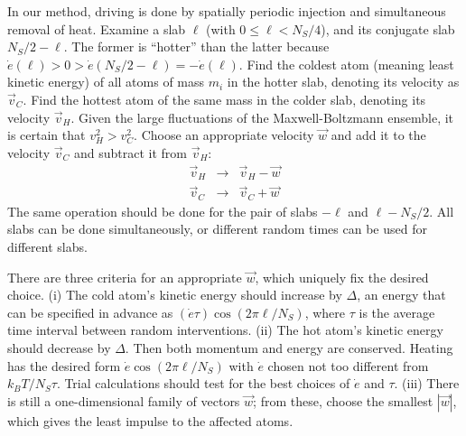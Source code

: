 \documentclass[aps,prb,twocolumn,showpacs,superscriptaddress]{revtex4-1}\begin{tiny}\end{tiny}
\begin{document}
In our method, driving is  done by spatially periodic injection and simultaneous removal of heat.  Examine a 
slab $\ell$ (with $0 \le \ell < N_S/4$), and its conjugate slab $N_S/2-\ell$.  The former
is ``hotter'' than the latter because ${\dot e}(\ell)>0>{\dot e}(N_S/2-\ell)=-{\dot e}(\ell)$.  Find the 
coldest atom (meaning least kinetic energy) of all atoms of mass $m_i$ 
in the hotter slab, denoting its velocity as $\vec{v}_C$.  Find the hottest atom
of the same mass in the colder slab, denoting its velocity $\vec{v}_H$. 
Given the large fluctuations of the Maxwell-Boltzmann ensemble, it is certain that 
$v_H^2 > v_C^2$.  Choose an appropriate velocity $\vec{w}$ and
add it to the velocity $\vec{v}_C$ and subtract it from $\vec{v}_H$:
%
\begin{eqnarray}
\vec{v}_H &\rightarrow& \vec{v}_H - \vec{w} \nonumber \\
\vec{v}_C &\rightarrow& \vec{v}_C + \vec{w} 
\label{eq:changev}
\end{eqnarray}
%
The same operation should be done for the pair of slabs $-\ell$ and $\ell-N_S/2$.  All slabs can
be done simultaneously, or different random times can be used for different slabs.

There are three criteria for an appropriate $\vec{w}$, which uniquely fix the desired choice.
(i) The cold atom's kinetic energy should increase by $\Delta$, an energy that can be specified
in advance as $({\dot e}\tau)\cos(2 \pi \ell/N_S)$, where $\tau$ is the average time interval
between random interventions.
(ii) The hot atom's kinetic energy should decrease by $\Delta$.  Then both momentum and 
energy are conserved.  Heating has the desired form ${\dot e}\cos(2\pi \ell/N_S)$
with ${\dot e}$ chosen not too different from $k_B T/N_S\tau$.  Trial calculations
should test for the best choices of ${\dot e}$ and $\tau$.
(iii) There is still a one-dimensional family of vectors $\vec{w}$; from these, choose the smallest
$|\vec{w}|$, which gives the least impulse to the affected atoms.
\end{document}
